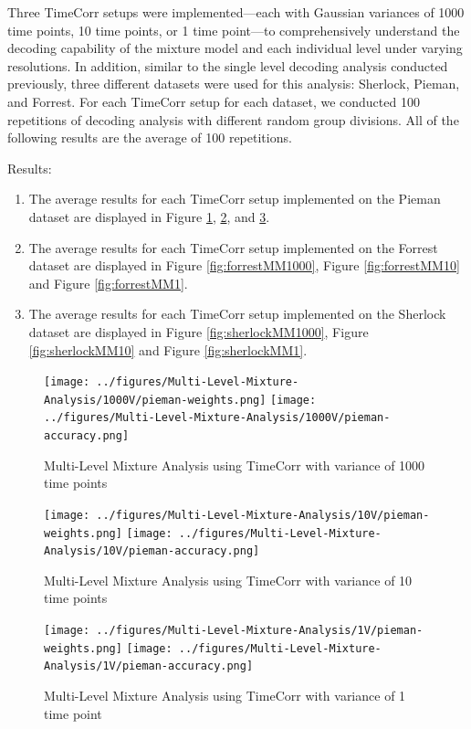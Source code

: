\documentclass[11pt]{article}
\begin{document}
Three TimeCorr setups were implemented---each with Gaussian variances of 1000 time points, 10 time points, or 1 time point---to comprehensively understand the decoding capability of the mixture model and each individual level under varying resolutions. In addition, similar to the single level decoding analysis conducted previously, three different datasets were used for this analysis: Sherlock, Pieman, and Forrest. For each TimeCorr setup for each dataset, we conducted 100 repetitions of decoding analysis with different random group divisions. All of the following results are the average of 100 repetitions.

Results:
\begin{enumerate}
\item The average results for each TimeCorr setup implemented on the Pieman dataset are displayed in Figure \ref{fig:piemanMM1000}, \ref{fig:piemanMM10}, and \ref{fig:piemanMM1}.
\item The average results for each TimeCorr setup implemented on the Forrest dataset are displayed in Figure \ref{fig:forrestMM1000}, Figure \ref{fig:forrestMM10} and Figure \ref{fig:forrestMM1}.
\item The average results for each TimeCorr setup implemented on the Sherlock dataset are displayed in Figure \ref{fig:sherlockMM1000}, Figure \ref{fig:sherlockMM10} and Figure \ref{fig:sherlockMM1}.
\end{enumerate}

\begin{figure}[!htb]
\caption{Multi-Level Mixture Analysis using TimeCorr with variance of 1000 time points}
\centering
\texttt{[image: ../figures/Multi-Level-Mixture-Analysis/1000V/pieman-weights.png]}
\texttt{[image: ../figures/Multi-Level-Mixture-Analysis/1000V/pieman-accuracy.png]}
\label{fig:piemanMM1000}
\end{figure}

\begin{figure}[!htb]
\caption{Multi-Level Mixture Analysis using TimeCorr with variance of 10 time points}
\centering
\texttt{[image: ../figures/Multi-Level-Mixture-Analysis/10V/pieman-weights.png]}
\texttt{[image: ../figures/Multi-Level-Mixture-Analysis/10V/pieman-accuracy.png]}
\label{fig:piemanMM10}
\end{figure}

\begin{figure}[!htb]
\caption{Multi-Level Mixture Analysis using TimeCorr with variance of 1 time point}
\centering
\texttt{[image: ../figures/Multi-Level-Mixture-Analysis/1V/pieman-weights.png]}
\texttt{[image: ../figures/Multi-Level-Mixture-Analysis/1V/pieman-accuracy.png]}
\label{fig:piemanMM1}
\end{figure}
\end{document}
